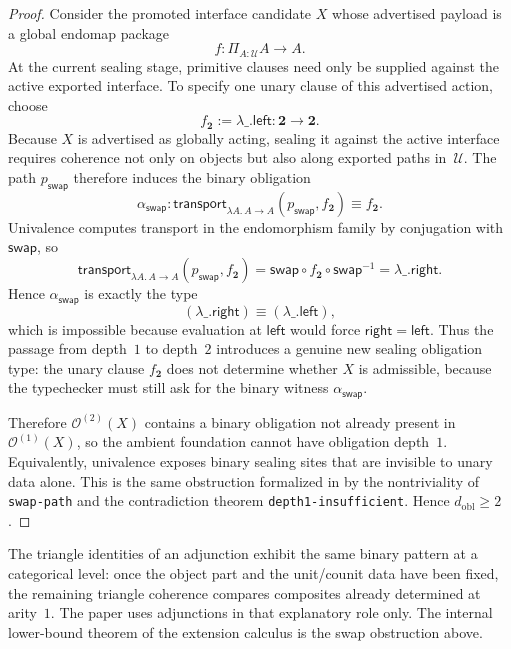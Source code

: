 \documentclass{lmcs}
\newcommand{\U}{\mathcal{U}}
\newcommand{\Ocal}{\mathcal{O}}
\begin{document}
\begin{proof}
Consider the promoted interface candidate $X$ whose advertised payload is a global endomap package
\[
  f : \Pi_{A:\U} A \to A.
\]
At the current sealing stage, primitive clauses need only be supplied against the active exported interface. To specify one unary clause of this advertised action, choose
\[
  f_{\mathbf{2}} := \lambda\_ . \mathsf{left} : \mathbf{2} \to \mathbf{2}.
\]
Because $X$ is advertised as globally acting, sealing it against the active interface requires coherence not only on objects but also along exported paths in~$\U$. The path $p_{\mathsf{swap}}$ therefore induces the binary obligation
\[
  \alpha_{\mathsf{swap}}
  :
  \mathsf{transport}_{\lambda A.\, A \to A}(p_{\mathsf{swap}}, f_{\mathbf{2}})
  \equiv
  f_{\mathbf{2}}.
\]
Univalence computes transport in the endomorphism family by conjugation with $\mathsf{swap}$, so
\[
  \mathsf{transport}_{\lambda A.\, A \to A}(p_{\mathsf{swap}}, f_{\mathbf{2}})
  =
  \mathsf{swap} \circ f_{\mathbf{2}} \circ \mathsf{swap}^{-1}
  =
  \lambda\_ . \mathsf{right}.
\]
Hence $\alpha_{\mathsf{swap}}$ is exactly the type
\[
  (\lambda\_ . \mathsf{right}) \equiv (\lambda\_ . \mathsf{left}),
\]
which is impossible because evaluation at $\mathsf{left}$ would force $\mathsf{right} = \mathsf{left}$. Thus the passage from depth~$1$ to depth~$2$ introduces a genuine new sealing obligation type: the unary clause $f_{\mathbf{2}}$ does not determine whether $X$ is admissible, because the typechecker must still ask for the binary witness $\alpha_{\mathsf{swap}}$.

Therefore $\Ocal^{(2)}(X)$ contains a binary obligation not already present in $\Ocal^{(1)}(X)$, so the ambient foundation cannot have obligation depth~$1$. Equivalently, univalence exposes binary sealing sites that are invisible to unary data alone. This is the same obstruction formalized in  by the nontriviality of \texttt{swap-path} and the contradiction theorem \texttt{depth1-insufficient}. Hence $d_{\mathrm{obl}} \geq 2$.
\end{proof}

\begin{rem}
\label{rem:adjunction-reading}
The triangle identities of an adjunction exhibit the same binary pattern at a categorical level: once the object part and the unit/counit data have been fixed, the remaining triangle coherence compares composites already determined at arity~$1$. The paper uses adjunctions in that explanatory role only. The internal lower-bound theorem of the extension calculus is the swap obstruction above.
\end{rem}
\end{document}
